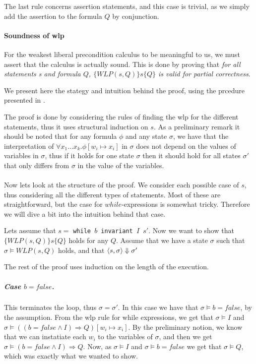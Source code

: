 The last rule concerns assertion statements, and this case is trivial, as we simply add the assertion to the formula $Q$ by conjunction.

\paragraph{Soundness of wlp}
For the weakest liberal precondition calculus to be meaningful to us, we must assert that the calculus is actually sound.
This is done by proving that \textit{for all statements s and formula $Q$, $\{WLP(s, Q)\}s\{Q\}$ is valid for partial correctness}.

We present here the stategy and intuition behind the proof, using the prcedure presented in \cite{wlp}.

The proof is done by considering the rules of finding the wlp for the different statements, thus it uses structural induction on $s$.
As a preliminary remark it should be noted that for any formula $\phi$ and any state $\sigma$, we have that the interpretation of $\forall x_{1} ... x_{k} . \phi [w_{i} \mapsto x_{i}]$ in $\sigma$ does not depend on the values of variables in $\sigma$, thus if it holds for one state $\sigma$ then it should hold for all states $\sigma'$ that only differs from $\sigma$ in the value of the variables.
\\~\\
Now lets look at the structure of the proof.
We consider each possible case of $s$, thus considering all the different types of statements.
Most of these are straightforward, but the case for $while$-expressions is somewhat tricky.
Therefore we will dive a bit into the intuition behind that case.

Lets assume that $s =$ \texttt{while $b$ invariant $I$ $s'$}.
Now we want to show that $\{WLP(s, Q)\}s\{Q\}$ holds for any $Q$.
Assume that we have a state $\sigma$ such that $\sigma \vDash WLP(s, Q)$ holds, and that $\langle s,\sigma \rangle \Downarrow \sigma'$

The rest of the proof uses induction on the length of the execution.

\subparagraph{Case $b=false$.}
This terminates the loop, thus $\sigma = \sigma'$.
In this case we have that $\sigma \vDash b = false$, by the assumption.
From the wlp rule for while expressions, we get that $\sigma \vDash I$ and $\sigma \vDash ((b = false \land I) \Rightarrow Q) [ w_{i} \mapsto x_{i}]$.
By the preliminary notion, we know that we can instatiate each $w_{i}$ to the variables of $\sigma$,
and then we get $\sigma \vDash (b = false \land I) \Rightarrow Q$.
Now, as $\sigma \vDash I$ and $\sigma \vDash b = false$ we get that $\sigma \vDash Q $, which was exactly what we wanted to show.

